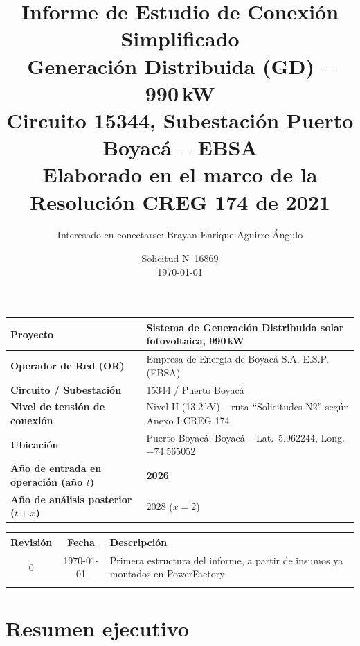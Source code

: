 \documentclass[11pt,a4paper]{article}
\title{\textbf{Informe de Estudio de Conexi\'on Simplificado}\\[0.3em]
\large Generaci\'on Distribuida (GD) -- 990\,kW\\
Circuito 15344, Subestaci\'on Puerto Boyac\'a -- EBSA\\[0.3em]
\normalsize Elaborado en el marco de la Resoluci\'on CREG 174 de 2021}
\author{Interesado en conectarse: Brayan Enrique Aguirre \'Angulo}
\date{Solicitud N\textdegree\ 16869 \\ \today}
\begin{document}
\begin{titlepage}
\maketitle
\thispagestyle{empty}

\vspace{2cm}
\begin{center}
\begin{tabular}{|>{\bfseries}p{5cm}|p{9cm}|}
\hline
Proyecto & Sistema de Generaci\'on Distribuida solar fotovoltaica, 990\,kW \\ \hline
Operador de Red (OR) & Empresa de Energ\'ia de Boyac\'a S.A. E.S.P. (EBSA) \\ \hline
Circuito / Subestaci\'on & 15344 / Puerto Boyac\'a \\ \hline
Nivel de tensi\'on de conexi\'on & Nivel II (13.2\,kV) -- ruta ``Solicitudes N2'' seg\'un Anexo I CREG 174 \\ \hline
Ubicaci\'on & Puerto Boyac\'a, Boyac\'a -- Lat.\ 5.962244, Long.\ $-74.565052$ \\ \hline
A\~no de entrada en operaci\'on (a\~no $t$) & \textbf{2026} \\ \hline
A\~no de an\'alisis posterior ($t+x$) & 2028 ($x=2$) \\ \hline
\end{tabular}
\end{center}

\vspace{1.5cm}
\begin{center}
\begin{tabular}{|c|c|p{8cm}|}
\hline
\textbf{Revisi\'on} & \textbf{Fecha} & \textbf{Descripci\'on} \\ \hline
0 & \today & Primera estructura del informe, a partir de insumos ya montados en PowerFactory \\ \hline
& & \\ \hline
\end{tabular}
\end{center}
\end{titlepage}

\tableofcontents
{}
\clearpage

\section{Resumen ejecutivo}
\end{document}
